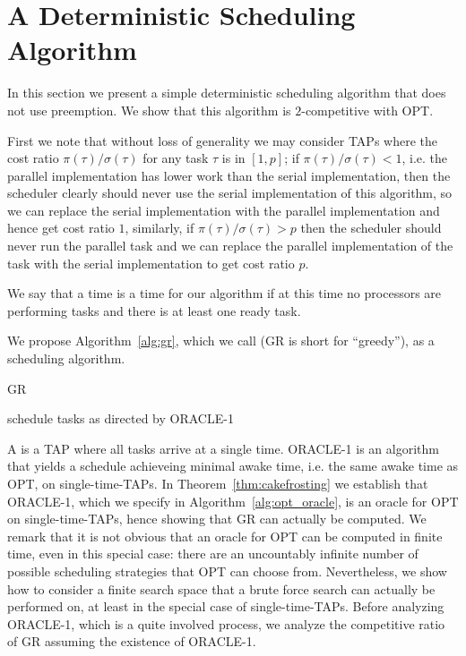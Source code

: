 \section{A Deterministic Scheduling Algorithm}
In this section we present a simple deterministic scheduling
algorithm that does not use preemption. We show that this
algorithm is $2$-competitive with OPT.

First we note that without loss of generality we may consider
TAPs where the cost ratio $\pi(\tau)/\sigma(\tau)$ for any task
$\tau$ is in $[1,p]$; if $\pi(\tau)/\sigma(\tau) < 1$, i.e. the
parallel implementation has lower work than the serial
implementation, then the scheduler clearly should never use the
serial implementation of this algorithm, so we can replace the
serial implementation with the parallel implementation and hence
get cost ratio $1$, similarly, if $\pi(\tau)/\sigma(\tau) > p$
then the scheduler should never run the parallel task and we can
replace the parallel implementation of the task with the serial
implementation to get cost ratio $p$.

We say that a time is a  time for our algorithm if at
this time no processors are performing tasks and there is at
least one ready task.

We propose Algorithm~\ref{alg:gr}, which we call 
(GR is short for \enquote{greedy}), as a scheduling algorithm.

\begin{algorithm}
  \caption{GR}
  \label{alg:gr}
  \begin{algorithmic}
        \State schedule tasks as directed by ORACLE-1 
      \EndIf
    \EndWhile
  \end{algorithmic}
\end{algorithm}

A  is a TAP where all tasks arrive at a
single time. ORACLE-1 is an algorithm that yields a schedule
achieveing minimal awake time, i.e. the same awake time as OPT,
on single-time-TAPs. In Theorem~\ref{thm:cakefrosting} we
establish that ORACLE-1, which we specify in
Algorithm~\ref{alg:opt_oracle}, is an oracle for OPT on
single-time-TAPs, hence showing that GR can actually be computed.
We remark that it is not obvious that an oracle for OPT can be
computed in finite time, even in this special case: there are an
uncountably infinite number of possible scheduling strategies
that OPT can choose from. Nevertheless, we show how to consider a
finite search space that a brute force search can actually be
performed on, at least in the special case of single-time-TAPs.
Before analyzing ORACLE-1, which is a quite involved process, we
analyze the competitive ratio of GR assuming the existence of
ORACLE-1. 

